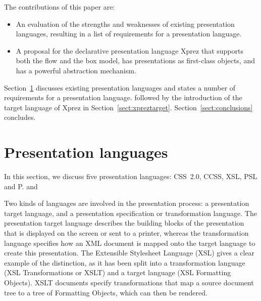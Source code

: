 \begin{center}
 \qquad
{}
\end{center}


\bc
The contributions of this paper are:

\begin{itemize}
\item An evaluation of the strengths and weaknesses of existing presentation languages, resulting in a list of requirements for a presentation language.
\item A proposal for the declarative presentation language {\sc Xprez} that supports both the flow and the box model, has presentations as first-class objects, and has a powerful abstraction mechanism.
\end{itemize}
\ec


\todo{}
Section~\ref{sect:targetlangs} discusses existing presentation languages and states a number of requirements for a presentation language. followed by the introduction of the target language of {\sc Xprez} in Section~\ref{sect:xpreztarget}.  Section~\ref{sect:conclusions} concludes.


%																
%																
%																
\section{Presentation languages} \label{sect:targetlangs}


In this section, we discuss five presentation languages: CSS~2.0, CCSS, XSL, PSL and P. 
\cite{sgml86} and \cite{dsssl96}

Two kinds of languages are involved in the presentation process: a presentation target language, and a presentation specification or transformation language. The presentation target language describes the building blocks of the presentation that is displayed on the screen or sent to a printer, whereas the transformation language specifies how an XML document is mapped onto the target language to create this presentation. The Extensible Stylesheet Language (XSL) gives a clear example of the distinction, as it has been split into a transformation language (XSL Transformations or XSLT) and a target language (XSL Formatting Objects). XSLT documents specify transformations that map a source document tree to a tree of Formatting Objects, which can then be rendered. 



